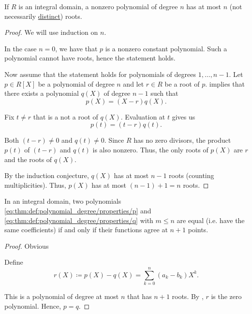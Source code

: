 \begin{proposition}\label{thm:integral_domain_polynomial_root_limit}
  If \( R \) is an integral domain, a nonzero polynomial of degree \( n \) has at most \( n \) (not necessarily \hyperref[def:polynomial_root_multiplicity]{distinct}) roots.
\end{proposition}
\begin{proof}
  We will use induction on \( n \).

  In the case \( n = 0 \), we have that \( p \) is a nonzero constant polynomial. Such a polynomial cannot have roots, hence the statement holds.

  Now assume that the statement holds for polynomials of degrees \( 1, \ldots, n - 1 \). Let \( p \in R[X] \) be a polynomial of degree \( n \) and let \( r \in R \) be a root of \( p \).  implies that there exists a polynomial \( q(X) \) of degree \( n - 1 \) such that
  \begin{equation*}
    p(X) = (X - r) q(X).
  \end{equation*}

  Fix \( t \neq r \) that is a not a root of \( q(X) \). Evaluation at \( t \) gives us
  \begin{equation*}
    p(t) = (t - r) q(t).
  \end{equation*}

  Both \( (t - r) \neq 0 \) and \( q(t) \neq 0 \). Since \( R \) has no zero divisors, the product \( p(t) \) of \( (t - r) \) and \( q(t) \) is also nonzero. Thus, the only roots of \( p(X) \) are \( r \) and the roots of \( q(X) \).

  By the induction conjecture, \( q(X) \) has at most \( n - 1 \) roots (counting multiplicities). Thus, \( p(X) \) has at most \( (n - 1) + 1 = n \) roots.
\end{proof}

\begin{proposition}\label{thm:polynomials_with_identical_values}
  In an integral domain, two polynomials \eqref{eq:thm:def:polynomial_degree/properties/p} and \eqref{eq:thm:def:polynomial_degree/properties/q} with \( m \leq n \) are equal (i.e. have the same coefficients) if and only if their functions agree at \( n + 1 \) points.
\end{proposition}
\begin{proof}
  \SufficiencySubProof Obvious

  \NecessitySubProof Define
  \begin{equation*}
    r(X) \coloneqq p(X) - q(X) = \sum_{k=0}^n (a_k - b_k) X^k.
  \end{equation*}

  This is a polynomial of degree at most \( n \) that has \( n + 1 \) roots. By , \( r \) is the zero polynomial. Hence, \( p = q \).
\end{proof}

